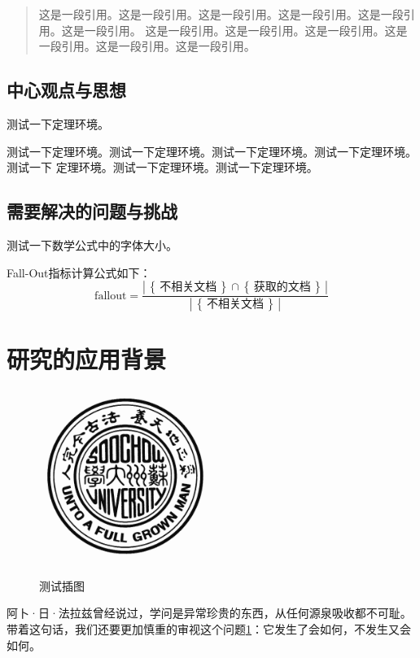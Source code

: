 \begin{quote}
这是一段引用。这是一段引用。这是一段引用。这是一段引用。这是一段引用。这是一段引用。
这是一段引用。这是一段引用。这是一段引用。这是一段引用。这是一段引用。这是一段引用。
\end{quote}




\subsection{中心观点与思想}

测试一下定理环境。

\begin{algorithm}
测试一下定理环境。测试一下定理环境。测试一下定理环境。测试一下定理环境。测试一下
定理环境。测试一下定理环境。测试一下定理环境。
\end{algorithm}


\subsection{需要解决的问题与挑战}

测试一下数学公式中的字体大小。

\newcommand{\set}[1]{\left\{\,#1\,\right\}}
\newcommand{\card}[1]{\left|\,#1\,\right|}

Fall-Out指标计算公式如下：
\begin{equation*}
  \mbox{fallout} = \frac{\card{\set{\text{不相关文档}}\cap\set{\text{获取的文档}}}}{\card{\set{\text{不相关文档}}}}
\end{equation*}



\section{研究的应用背景}

\begin{figure}[htbp]
  \centering
  \includegraphics[width= 0.5\textwidth]{img/SchoolMark.jpg}\\
  \caption{测试插图}\label{fig:test1}
\end{figure}


阿卜·日·法拉兹曾经说过，学问是异常珍贵的东西，从任何源泉吸收都不可耻。带着这句话，我们还要更加慎重的审视这个问题\ref{fig:test1}：它发生了会如何，不发生又会如何。